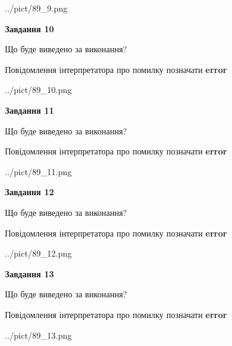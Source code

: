 \documentclass[11pt, ukrainian]{article}
\begin{document}
{\begin {large}
\begin{center}
	{../pict/89_9.png}
\end{center}
\newpage

{\begin {center}\textbf{Завдання 10}\end {center}}\par
Що буде виведено за виконання? \par
Повідомлення інтерпретатора про помилку позначати \textbf{error}

\begin{center}
	{../pict/89_10.png}
\end{center}
\newpage

{\begin {center}\textbf{Завдання 11}\end {center}}\par
Що буде виведено за виконання? \par
Повідомлення інтерпретатора про помилку позначати \textbf{error}

\begin{center}
	{../pict/89_11.png}
\end{center}
\newpage

{\begin {center}\textbf{Завдання 12}\end {center}}\par
Що буде виведено за виконання? \par
Повідомлення інтерпретатора про помилку позначати \textbf{error}

\begin{center}
	{../pict/89_12.png}
\end{center}
\newpage

{\begin {center}\textbf{Завдання 13}\end {center}}\par
Що буде виведено за виконання? \par
Повідомлення інтерпретатора про помилку позначати \textbf{error}

\begin{center}
	{../pict/89_13.png}
\end{center}
\newpage


\end{large}}
\end{document}
